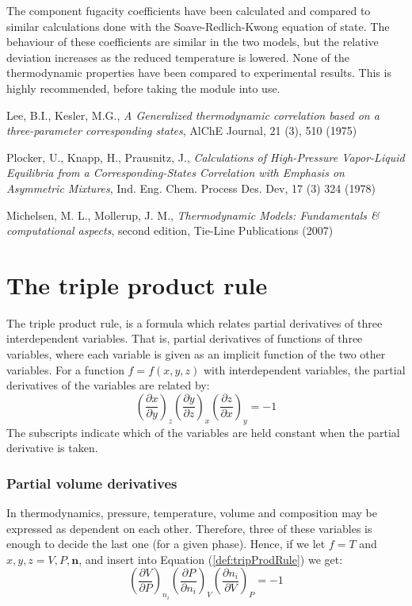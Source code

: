 \documentclass[english]{../thermomemo/thermomemo}
\numberwithin{equation}{section}
\newcommand*{\pder}[2]{\left(\frac{\partial #1}{\partial #2}\right)}
\newcommand*{\reff}[1]{(\ref{#1})}
\begin{document}
The component fugacity coefficients have been calculated and compared to similar calculations done with the Soave-Redlich-Kwong equation of state. The behaviour of these coefficients are similar in the two models, but the relative deviation increases as the reduced temperature is lowered. 
None of the thermodynamic properties have been compared to experimental results. This is highly recommended, before taking the module into use.

\clearpage
\begin{thebibliography}{9}
  
	Lee, B.I., Kesler, M.G., \textit{A Generalized thermodynamic correlation based on a three-parameter corresponding states}, AlChE Journal, 21 (3), 510 (1975)

	Plocker, U., Knapp, H., Prausnitz, J., \textit{Calculations of High-Pressure Vapor-Liquid Equilibria from a Corresponding-States Correlation with Emphasis on Asymmetric Mixtures}, Ind. Eng. Chem. Process Des. Dev, 17 (3) 324 (1978)
	
	Michelsen, M. L., Mollerup, J. M., \textit{Thermodynamic Models: Fundamentals \& computational aspects}, second edition, Tie-Line Publications (2007)


\end{thebibliography}

\clearpage
\appendix

\section{The triple product rule}
\label{app:tripProdRule}
The triple product rule, is a formula which relates partial derivatives of three interdependent variables. That is, partial derivatives of functions of three variables, where each variable is given as an implicit function of the two other variables. For a function $f = f(x,y,z)$ with interdependent variables, the partial derivatives of the variables are related by:
\begin{equation}
\label{def:tripProdRule}
\pder{x}{y}_z \pder{y}{z}_x \pder{z}{x}_y = -1
\end{equation}
The subscripts indicate which of the variables are held constant when the partial derivative is taken.

\subsubsection*{Partial volume derivatives}
In thermodynamics, pressure, temperature, volume and composition may be expressed as dependent on each other. Therefore, three of these variables is enough to decide the last one (for a given phase). Hence, if we let $f = T$ and $x,y,z = V,P,\textbf{n}$, and insert into Equation \reff{def:tripProdRule} we get:
\begin{equation}
\pder{V}{P}_{n_i} \pder{P}{n_i}_V \pder{n_i}{V}_P = -1
\end{equation}
\end{document}
